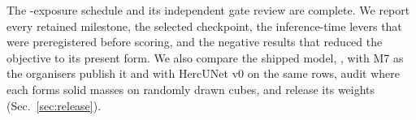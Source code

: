 The \fzHorizon-exposure schedule and its independent gate review are complete.
We report every retained milestone, the selected checkpoint, the inference-time
levers that were preregistered before scoring, and the negative results that
reduced the objective to its present form.
We also compare the shipped model, \releaseName, with M7 as the organisers
publish it and with HercUNet v0 on the same rows, audit where each forms solid
masses on randomly drawn cubes, and release its weights
(Sec.~\ref{sec:release}).
